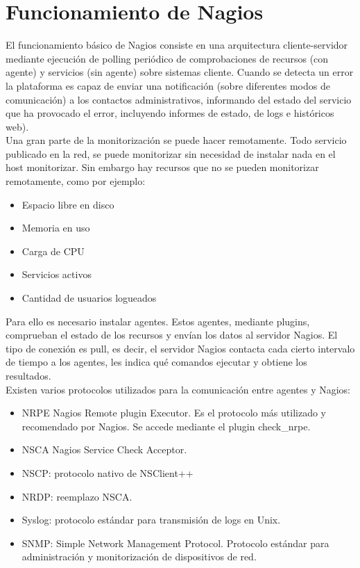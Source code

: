 \documentclass[11pt,a4paper]{article}
\begin{document}
    
\section{Funcionamiento de Nagios}


El funcionamiento básico de Nagios consiste en una arquitectura cliente-servidor mediante ejecución de polling periódico de comprobaciones de recursos (con agente) y servicios (sin agente) sobre sistemas cliente. Cuando se detecta un error la plataforma es capaz de enviar una notificación (sobre diferentes modos de comunicación) a los contactos administrativos, informando del estado del servicio que ha provocado el error, incluyendo informes de estado, de logs e históricos web).\\


Una gran parte de la monitorización se puede hacer remotamente. Todo servicio publicado en la red, se puede monitorizar sin necesidad de instalar nada en el host monitorizar. Sin embargo hay recursos que no se pueden monitorizar remotamente, como por ejemplo:
\begin{itemize}

\item  Espacio libre en disco
\item  Memoria en uso
\item  Carga de CPU
\item  Servicios activos
\item  Cantidad de usuarios logueados

\end{itemize}

Para ello es necesario instalar agentes. Estos agentes, mediante plugins, comprueban el estado de los recursos y envían los datos al servidor Nagios. El tipo de conexión es pull, es decir, el servidor Nagios contacta cada cierto intervalo de tiempo a los agentes, les indica qué comandos ejecutar y obtiene los resultados.\\

Existen varios protocolos utilizados para la comunicación entre agentes y Nagios:
\begin{itemize}
\item  NRPE Nagios Remote plugin Executor. Es el protocolo más utilizado y recomendado por Nagios. Se accede mediante el plugin check\_nrpe.
\item  NSCA Nagios Service Check Acceptor.
\item  NSCP: protocolo nativo de NSClient++
\item  NRDP: reemplazo NSCA.
\item  Syslog: protocolo estándar para transmisión de logs en Unix.
\item  SNMP: Simple Network Management Protocol. Protocolo estándar para administración y monitorización de dispositivos de red.

\end{itemize}
\end{document}
